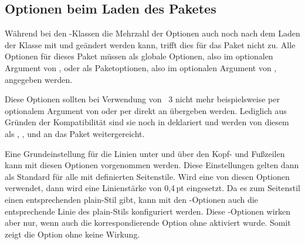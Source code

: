 \subsection{Optionen beim Laden des Paketes}
\label{sec:scrpage-de.basics.options}

Während bei den \KOMAScript-Klassen die Mehrzahl der Optionen auch noch nach
dem Laden der Klasse mit  und  geändert
werden kann, trifft dies für das Paket  nicht zu. Alle Optionen für dieses Paket müssen als globale Optionen, also
im optionalen Argument von , oder als Paketoptionen, also
im optionalen Argument von , angegeben werden.

\begin{Declaration}
\end{Declaration}%
Diese Optionen sollten bei Verwendung von
\KOMAScript~3 nicht mehr beispielsweise
per optionalem Argument von  oder per
 direkt an  übergeben
werden. Lediglich aus Gründen der Kompatibilität sind sie noch in
 deklariert und werden von diesem als ,
,  und
 an das Paket 
weitergereicht.
\EndIndexGroup


\begin{Declaration}
\end{Declaration}%
Eine Grundeinstellung für die Linien unter und über den Kopf- und Fußzeilen
kann mit diesen Optionen vorgenommen werden.  Diese Einstellungen gelten dann
als Standard für alle mit  definierten Seitenstile.  Wird
eine von diesen Optionen verwendet, dann wird eine Linienstärke von 0,4\,pt
eingesetzt.  Da es zum Seitenstil  einen entsprechenden
plain-Stil gibt, kann mit den -Optionen auch die
entsprechende Linie des plain-Stils konfiguriert werden. Diese
-Optionen wirken aber nur, wenn auch die korrespondierende
Option ohne  aktiviert wurde.  Somit zeigt die Option
 ohne  keine Wirkung.

